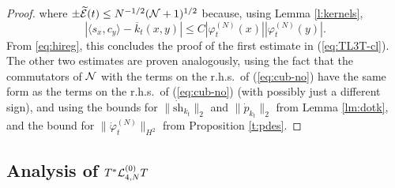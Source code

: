 \documentclass[11pt,a4paper]{article}
\newcommand{\wt}{\widetilde}
\newcommand{\cE}{{\cal E}}
\newcommand{\cL}{{\cal L}}
\newcommand{\cN}{{\cal N}}
\begin{document}
\begin{proof}
where $\pm \wt{\cE} (t) \leq N^{-1/2} (\cN+1)^{1/2}$ because, using Lemma
\ref{l:kernels}, \[ |\langle s_x , c_y \rangle - \overline{k}_t (x,y)| \leq
C |\varphi_t^{(N)} (x)| |\varphi_t^{(N)} (y)|.\] {F}rom  \eqref{eq:hireg},
this concludes the proof of the first estimate in (\ref{eq:TL3T-cl}). The
other two estimates are proven analogously, using the fact that the
commutators of $\cN$ with the terms on the r.h.s.\ of (\ref{eq:cub-no}) have
the same form as the terms on the r.h.s.\ of (\ref{eq:cub-no}) (with
possibly just a different sign), and using the bounds for $\|
\dot{\text{sh}}_{k_t} \|_2$ and $\| \dot{p}_{k_t} \|_2$ from Lemma
\ref{lm:dotk}, and the bound for $\| \dot{\varphi}_t^{(N)} \|_{H^2}$ from
Proposition \ref{t:pdes}.
\end{proof}

\subsection{Analysis of $T^* \cL^{(0)}_{4,N} T$}
\end{document}

